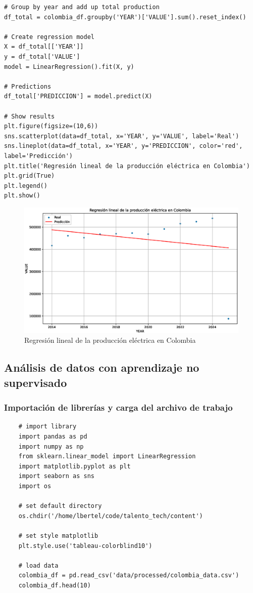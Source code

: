 \documentclass{article}
\begin{document}
\begin{verbatim}
# Group by year and add up total production
df_total = colombia_df.groupby('YEAR')['VALUE'].sum().reset_index()

# Create regression model
X = df_total[['YEAR']]
y = df_total['VALUE']
model = LinearRegression().fit(X, y)

# Predictions
df_total['PREDICCION'] = model.predict(X)

# Show results
plt.figure(figsize=(10,6))
sns.scatterplot(data=df_total, x='YEAR', y='VALUE', label='Real')
sns.lineplot(data=df_total, x='YEAR', y='PREDICCION', color='red', label='Predicción')
plt.title('Regresión lineal de la producción eléctrica en Colombia')
plt.grid(True)
plt.legend()
plt.show()
\end{verbatim}

\begin{figure}[t]
	\centering
	\includegraphics[width=0.7\linewidth]{fig_18}
	\caption{Regresión lineal de la producción eléctrica en Colombia}
	\label{fig:fig18}
\end{figure}


\subsection{An\'alisis de datos con aprendizaje no supervisado}

\subsubsection{Importaci\'on de librer\'ias y carga del archivo de trabajo}

\begin{verbatim}
	# import library
	import pandas as pd
	import numpy as np
	from sklearn.linear_model import LinearRegression
	import matplotlib.pyplot as plt
	import seaborn as sns
	import os
	
	# set default directory
	os.chdir('/home/lbertel/code/talento_tech/content')
	
	# set style matplotlib
	plt.style.use('tableau-colorblind10')
	
	# load data
	colombia_df = pd.read_csv('data/processed/colombia_data.csv')
	colombia_df.head(10)
\end{verbatim}
\end{document}

